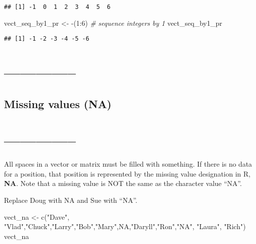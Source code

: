 \documentclass[
]{article}
\newenvironment{Shaded}{\begin{snugshade}}{\end{snugshade}}
\newcommand{\CommentTok}[1]{\textcolor[rgb]{0.56,0.35,0.01}{\textit{#1}}}
\newcommand{\ConstantTok}[1]{\textcolor[rgb]{0.00,0.00,0.00}{#1}}
\newcommand{\DecValTok}[1]{\textcolor[rgb]{0.00,0.00,0.81}{#1}}
\newcommand{\FunctionTok}[1]{\textcolor[rgb]{0.00,0.00,0.00}{#1}}
\newcommand{\NormalTok}[1]{#1}
\newcommand{\OtherTok}[1]{\textcolor[rgb]{0.56,0.35,0.01}{#1}}
\newcommand{\SpecialCharTok}[1]{\textcolor[rgb]{0.00,0.00,0.00}{#1}}
\newcommand{\StringTok}[1]{\textcolor[rgb]{0.31,0.60,0.02}{#1}}
\begin{document}
\begin{verbatim}
## [1] -1  0  1  2  3  4  5  6
\end{verbatim}

\begin{Shaded}
\begin{Highlighting}[]
\NormalTok{vect\_seq\_by1\_pr }\OtherTok{\textless{}{-}} \SpecialCharTok{{-}}\NormalTok{(}\DecValTok{1}\SpecialCharTok{:}\DecValTok{6}\NormalTok{) }\CommentTok{\# sequence integers by 1}
\NormalTok{vect\_seq\_by1\_pr}
\end{Highlighting}
\end{Shaded}

\begin{verbatim}
## [1] -1 -2 -3 -4 -5 -6
\end{verbatim}

\hypertarget{section-22}{%
\section{--------------}\label{section-22}}

\hypertarget{missing-values-na}{%
\subsection{Missing values (NA)}\label{missing-values-na}}

\hypertarget{section-23}{%
\section{--------------}\label{section-23}}

All spaces in a vector or matrix must be filled with something. If there
is no data for a position, that position is represented by the missing
value designation in R, \textbf{NA}. Note that a missing value is NOT
the same as the character value ``NA''.

Replace Doug with NA and Sue with ``NA''.

\begin{Shaded}
\begin{Highlighting}[]
\NormalTok{vect\_na }\OtherTok{\textless{}{-}} \FunctionTok{c}\NormalTok{(}\StringTok{"Dave"}\NormalTok{, }\StringTok{"Vlad"}\NormalTok{,}\StringTok{"Chuck"}\NormalTok{,}\StringTok{"Larry"}\NormalTok{,}\StringTok{"Bob"}\NormalTok{,}\StringTok{"Mary"}\NormalTok{,}\ConstantTok{NA}\NormalTok{,}\StringTok{"Daryll"}\NormalTok{,}\StringTok{"Ron"}\NormalTok{,}\StringTok{"NA"}\NormalTok{, }\StringTok{"Laura"}\NormalTok{, }\StringTok{"Rich"}\NormalTok{)}
\NormalTok{vect\_na}
\end{Highlighting}
\end{Shaded}
\end{document}

